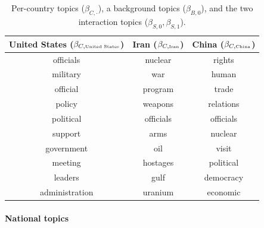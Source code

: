 \begin{table}
\begin{tabular}{|c|c|c|}
  \textbf{United States ($\beta_{C,\mbox{\tiny United States}}$)} &
  \textbf{Iran ($\beta_{C,\mbox{\tiny Iran}}$)} &
  \textbf{China ($\beta_{C,\mbox{\tiny China}}$)} \\
  \hline
  officials & nuclear & rights \\
  military & war & human \\
  official & program & trade \\
  policy & weapons & relations \\
  political & officials & officials \\
  support & arms & nuclear \\
  government & oil & visit \\
  meeting & hostages & political \\
  leaders & gulf & democracy \\
  administration & uranium & economic \\
  \hline
\end{tabular}
\caption{Per-country topics ($\beta_{C,\cdot}$), a background topics ($\beta_{B,0}$), and the two interaction topics ($\beta_{S,0}, \beta_{S,1}$).}
\label{table:fr_unsupervised_topics}
\end{table}
\paragraph{National topics}



